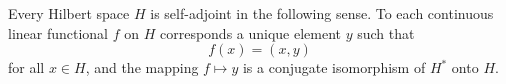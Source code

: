 Every Hilbert space $H$ is self-adjoint in the following sense. To each continuous linear functional $f$ on $H$ corresponds a unique element $y$ such that
$$f(x) = (x, y)$$
for all $x \in H$, and the mapping $f \mapsto y$ is a conjugate isomorphism of $H^*$ onto $H$.
